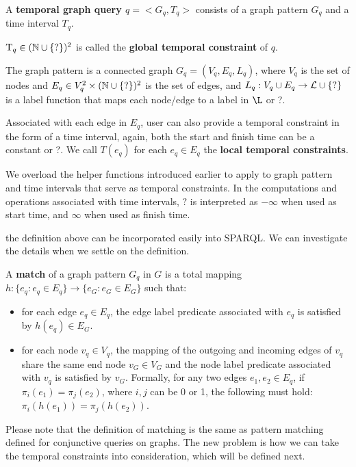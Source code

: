 \begin{defn}
  A {\bf temporal graph query $q = <G_q, T_q>$} consists of a graph pattern
  $G_q$ and a time interval $T_q$.

$\text{T}_q \in (\mathbb{N} \cup \{?\})^2$ is  called the {\bf global temporal constraint} of $q$.

The graph pattern is a connected graph $G_q = (V_q, E_q, L_q)$, where $V_q$ is the
set of nodes and $E_q \in V_q^2 \times (\mathbb{N} \cup \{?\})^2$ is the set of edges, and $L_q: V_q \cup E_q \rightarrow \mathcal{L} \cup \{?\}$ is a label function  that maps each
node/edge to a label in $\L$ or ?. 

Associated with each edge in $E_q$, user can also provide a temporal constraint 
in the form of a time interval, again, both the start and finish time can be a constant or ?.
We call  $T(e_q)$ for each $e_q \in E_q$ the {\bf local temporal constraints}.
\end{defn}

We overload the helper functions introduced earlier to apply to graph pattern
and time intervals that serve as temporal constraints. In the computations and operations associated with time intervals, $?$ is interpreted as $-\infty$ when used as start time, and $\infty$ when used as finish time. 

 the definition above can be incorporated easily into
SPARQL. We can investigate the details when we settle on the definition.

\begin{defn}
  \label{defn:match}
  A {\bf match} of a graph pattern $G_q$ in $G$ is a total mapping $h: \{e_q: e_q
  \in E_q\} \rightarrow \{e_G: e_G \in E_G\} $ such that:

  \begin{itemize}
    \item for each edge $e_q \in E_q$, the edge label predicate associated with
      $e_q$ is satisfied by $h(e_q) \in E_G$.
    \item for each node $v_q \in V_q$, the mapping of the outgoing and incoming
      edges of $v_q$ share the same end node $v_G \in V_G$ and the node label
      predicate associated with $v_q$ is satisfied by $v_G$. Formally, for any
      two edges $e_1, e_2 \in E_q$, if $\pi_i(e_1) = \pi_j(e_2)$, where $i ,j$
      can be 0 or 1, the following must hold: $\pi_i(h(e_1)) = \pi_j(h(e_2))$.
\end{itemize}
\end{defn}

Please note that the definition of matching is the same as pattern matching
defined for conjunctive queries on graphs. The new problem is how we can take the
temporal constraints into consideration, which will be defined next.

